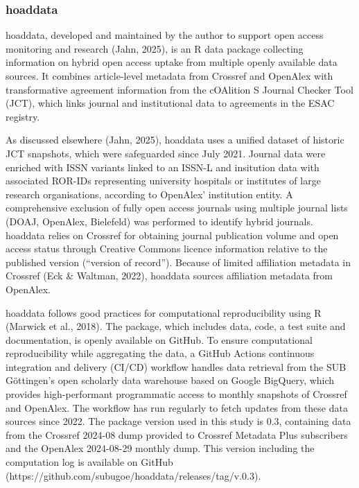 \documentclass[a4paper,man,floatsintext,longtable,noextraspace,10pt]{apa6}
\begin{document}
\subsubsection{hoaddata}\label{hoaddata}

hoaddata, developed and maintained by the author to support open access
monitoring and research (Jahn, 2025), is an R data package collecting
information on hybrid open access uptake from multiple openly available
data sources. It combines article-level metadata from Crossref and
OpenAlex with transformative agreement information from the cOAlition S
Journal Checker Tool (JCT), which links journal and institutional data
to agreements in the ESAC registry.

As discussed elsewhere (Jahn, 2025), hoaddata uses a unified dataset of
historic JCT snapshots, which were safeguarded since July 2021. Journal
data were enriched with ISSN variants linked to an ISSN-L and insitution
data with associated ROR-IDs representing university hospitals or
institutes of large research organisations, according to OpenAlex'
institution entity. A comprehensive exclusion of fully open access
journals using multiple journal lists (DOAJ, OpenAlex, Bielefeld) was
performed to identify hybrid journals. hoaddata relies on Crossref for
obtaining journal publication volume and open access status through
Creative Commons licence information relative to the published version
(``version of record''). Because of limited affiliation metadata in
Crossref (Eck \& Waltman, 2022), hoaddata sources affiliation metadata
from OpenAlex.

hoaddata follows good practices for computational reproducibility using
R (Marwick et al., 2018). The package, which includes data, code, a test
suite and documentation, is openly available on GitHub. To ensure
computational reproducibility while aggregating the data, a GitHub
Actions continuous integration and delivery (CI/CD) workflow handles
data retrieval from the SUB Göttingen's open scholarly data warehouse
based on Google BigQuery, which provides high-performant programmatic
access to monthly snapshots of Crossref and OpenAlex. The workflow has
run regularly to fetch updates from these data sources since 2022. The
package version used in this study is 0.3, containing data from the
Crossref 2024-08 dump provided to Crossref Metadata Plus subscribers and
the OpenAlex 2024-08-29 monthly dump. This version including the
computation log is available on GitHub
(https://github.com/subugoe/hoaddata/releases/tag/v.0.3).
\end{document}

